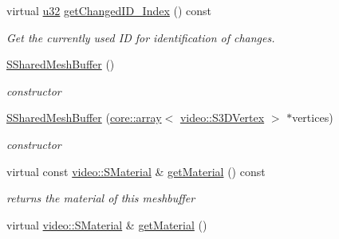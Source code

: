 \begin{DoxyCompactItemize}
virtual \hyperlink{namespaceirr_a0416a53257075833e7002efd0a18e804}{u32} \hyperlink{structirr_1_1scene_1_1SSharedMeshBuffer_a0a37d52f7ec9917d9ca0d9dd908917b9}{get\+Changed\+I\+D\+\_\+\+Index} () const
\begin{DoxyCompactList}\small\item\em Get the currently used ID for identification of changes. \end{DoxyCompactList}\item 
\mbox{\label{structirr_1_1scene_1_1SSharedMeshBuffer_a9d122d688d0823345807cf9ef0efb952}} 
\hyperlink{structirr_1_1scene_1_1SSharedMeshBuffer_a9d122d688d0823345807cf9ef0efb952}{S\+Shared\+Mesh\+Buffer} ()
\begin{DoxyCompactList}\small\item\em constructor \end{DoxyCompactList}\item 
\mbox{\label{structirr_1_1scene_1_1SSharedMeshBuffer_ac6bc32830ae182696d3063a972762bec}} 
\hyperlink{structirr_1_1scene_1_1SSharedMeshBuffer_ac6bc32830ae182696d3063a972762bec}{S\+Shared\+Mesh\+Buffer} (\hyperlink{classirr_1_1core_1_1array}{core\+::array}$<$ \hyperlink{structirr_1_1video_1_1S3DVertex}{video\+::\+S3\+D\+Vertex} $>$ $\ast$vertices)
\begin{DoxyCompactList}\small\item\em constructor \end{DoxyCompactList}\item 
\mbox{\label{structirr_1_1scene_1_1SSharedMeshBuffer_aea6a55293929329800d6299f86b65841}} 
virtual const \hyperlink{classirr_1_1video_1_1SMaterial}{video\+::\+S\+Material} \& \hyperlink{structirr_1_1scene_1_1SSharedMeshBuffer_aea6a55293929329800d6299f86b65841}{get\+Material} () const
\begin{DoxyCompactList}\small\item\em returns the material of this meshbuffer \end{DoxyCompactList}\item 
\mbox{\label{structirr_1_1scene_1_1SSharedMeshBuffer_ac1dcea2247c8f63adc4a5935ce39bcbc}} 
virtual \hyperlink{classirr_1_1video_1_1SMaterial}{video\+::\+S\+Material} \& \hyperlink{structirr_1_1scene_1_1SSharedMeshBuffer_ac1dcea2247c8f63adc4a5935ce39bcbc}{get\+Material} ()

\end{DoxyCompactItemize}
